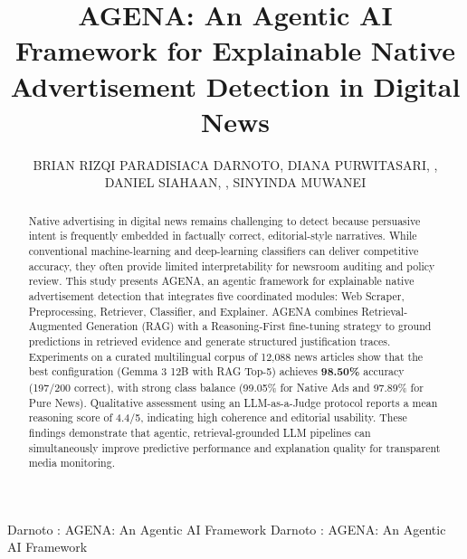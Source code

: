 \documentclass{ieeeaccess}
\begin{document}

\title{AGENA: An Agentic AI Framework for Explainable Native Advertisement Detection in Digital News}
\author{\uppercase{Brian Rizqi Paradisiaca Darnoto, Diana Purwitasari, , Daniel Siahaan,
}, \uppercase{Sinyinda Muwanei}}
\address[]{Informatics Department, Institut Teknologi Sepuluh Nopember, Surabaya, 60111, Indonesia}
\address[]{Informatics Department, Univerisity of Jember, Jember, 68121, Indonesia}
\address[]{Department of Computer Science and Information Technology, Mulungushi University, Kabwe, 10101, Zambia }

\markboth
{Darnoto \headeretal: AGENA: An Agentic AI Framework}
{Darnoto \headeretal: AGENA: An Agentic AI Framework}


\begin{abstract}
Native advertising in digital news remains challenging to detect because persuasive intent is frequently embedded in factually correct, editorial-style narratives. While conventional machine-learning and deep-learning classifiers can deliver competitive accuracy, they often provide limited interpretability for newsroom auditing and policy review. This study presents AGENA, an agentic framework for explainable native advertisement detection that integrates five coordinated modules: Web Scraper, Preprocessing, Retriever, Classifier, and Explainer. AGENA combines Retrieval-Augmented Generation (RAG) with a Reasoning-First fine-tuning strategy to ground predictions in retrieved evidence and generate structured justification traces. Experiments on a curated multilingual corpus of 12,088 news articles show that the best configuration (Gemma 3 12B with RAG Top-5) achieves \textbf{98.50\%} accuracy (197/200 correct), with strong class balance (99.05\% for Native Ads and 97.89\% for Pure News). Qualitative assessment using an LLM-as-a-Judge protocol reports a mean reasoning score of 4.4/5, indicating high coherence and editorial usability. These findings demonstrate that agentic, retrieval-grounded LLM pipelines can simultaneously improve predictive performance and explanation quality for transparent media monitoring.
\end{abstract}
\end{document}
